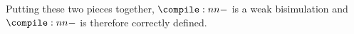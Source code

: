 Putting these two pieces together, $\cmp{{-}}$ is a weak bisimulation and $\cmp{{-}}$ is therefore correctly defined.









